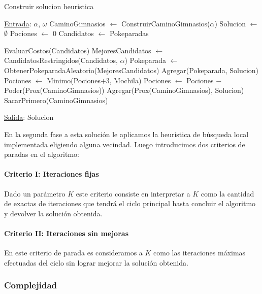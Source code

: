 \begin{algorithm}[H]

\label{}
\caption{Construir solucion heuristica}

\begin{algorithmic}[1]

\Statex \underline{Entrada}: $\alpha$, $\omega$
\medskip
\State CaminoGimnasios $\gets$ ConstruirCaminoGimnasios($\alpha$)
\State Solucion $\gets$ $\emptyset$
\State Pociones $\gets$ $0$
\State Candidatos $\gets$ Pokeparadas

		\State EvaluarCostos(Candidatos)
		\State MejoresCandidatos $\gets$ CandidatosRestringidos(Candidatos, $\alpha$)
		\State Pokeparada $\gets$ ObtenerPokeparadaAleatorio(MejoresCandidatos)
		\State Agregar(Pokeparada, Solucion)
		\State Pociones $\gets$ Minimo(Pociones$+3$, Mochila)
	\EndWhile
	\State Pociones $\gets$  Pociones $-$ Poder(Prox(CaminoGimnasios))
	\State  Agregar(Prox(CaminoGimnasios), Solucion)
	\State  SacarPrimero(CaminoGimnasios)
\EndWhile

\medskip
\Statex \underline{Salida}: Solucion

\end{algorithmic}
\end{algorithm}

En la segunda fase a esta solución le aplicamos la heuristica de búsqueda local implementada eligiendo alguna vecindad. Luego introducimos dos criterios de paradas en el algoritmo:

\paragraph{Criterio I: Iteraciones fijas}
Dado un parámetro $K$ este criterio consiste en interpretar a $K$ como la cantidad de exactas de iteraciones que tendrá el ciclo principal hasta concluir el algoritmo y devolver la solución obtenida.

\paragraph{Criterio II: Iteraciones sin mejoras}
En este criterio de parada es consideramos a $K$ como las iteraciones máximas efectuadas del ciclo sin lograr mejorar la solución obtenida.


\subsubsection{Complejidad}

